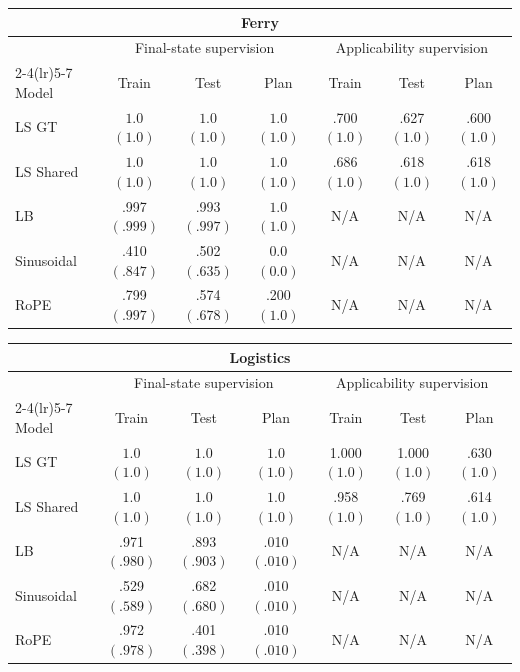 \begin{table}[t]
\begin{tabular*}{\linewidth}{@{\extracolsep{\fill}}lcccccc@{}}
\toprule
\multicolumn{7}{c}{\textbf{Ferry}} \\
\midrule
& \multicolumn{3}{c}{Final-state supervision} & \multicolumn{3}{c}{Applicability supervision} \\
\cmidrule(lr){2-4}\cmidrule(lr){5-7}
Model & Train & Test & Plan & Train & Test & Plan \\
\midrule
LS GT
& $\mathbf{1.0}$ $(\mathbf{1.0})$
& $\mathbf{1.0}$ $(\mathbf{1.0})$
& $\mathbf{1.0}$ $(\mathbf{1.0})$
& .700 $(\mathbf{1.0})$
& .627 $(\mathbf{1.0})$
& .600 $(\mathbf{1.0})$ \\
LS Shared
& $\mathbf{1.0}$ $(\mathbf{1.0})$
& $\mathbf{1.0}$ $(\mathbf{1.0})$
& $\mathbf{1.0}$ $(\mathbf{1.0})$
& .686 $(\mathbf{1.0})$
& .618 $(\mathbf{1.0})$
& .618 $(\mathbf{1.0})$ \\
LB
& .997 $(.999)$
& .993 $(.997)$
& $\mathbf{1.0}$ $(\mathbf{1.0})$
& N/A
& N/A
& N/A \\
Sinusoidal
& .410 $(.847)$
& .502 $(.635)$
& 0.0 $(0.0)$
& N/A
& N/A
& N/A \\
RoPE
& .799 $(.997)$
& .574 $(.678)$
& .200 $(\mathbf{1.0})$
& N/A
& N/A
& N/A \\
\bottomrule
\end{tabular*}

\vspace{0.7em}

\begin{tabular*}{\linewidth}{@{\extracolsep{\fill}}lcccccc@{}}
\toprule
\multicolumn{7}{c}{\textbf{Logistics}} \\
\midrule
& \multicolumn{3}{c}{Final-state supervision} & \multicolumn{3}{c}{Applicability supervision} \\
\cmidrule(lr){2-4}\cmidrule(lr){5-7}
Model & Train & Test & Plan & Train & Test & Plan \\
\midrule
LS GT
& $\mathbf{1.0}$ $(\mathbf{1.0})$
& $\mathbf{1.0}$ $(\mathbf{1.0})$
& $\mathbf{1.0}$ $(\mathbf{1.0})$
& 1.000 $(\mathbf{1.0})$
& 1.000 $(\mathbf{1.0})$
& .630 $(\mathbf{1.0})$ \\
LS Shared
& $\mathbf{1.0}$ $(\mathbf{1.0})$
& $\mathbf{1.0}$ $(\mathbf{1.0})$
& $\mathbf{1.0}$ $(\mathbf{1.0})$
& .958 $(\mathbf{1.0})$
& .769 $(\mathbf{1.0})$
& .614 $(\mathbf{1.0})$ \\
LB
& .971 $(.980)$
& .893 $(.903)$
& .010 $(.010)$
& N/A
& N/A
& N/A \\
Sinusoidal
& .529 $(.589)$
& .682 $(.680)$
& .010 $(.010)$
& N/A
& N/A
& N/A \\
RoPE
& .972 $(.978)$
& .401 $(.398)$
& .010 $(.010)$
& N/A
& N/A
& N/A \\
\bottomrule
\end{tabular*}

\end{table}

